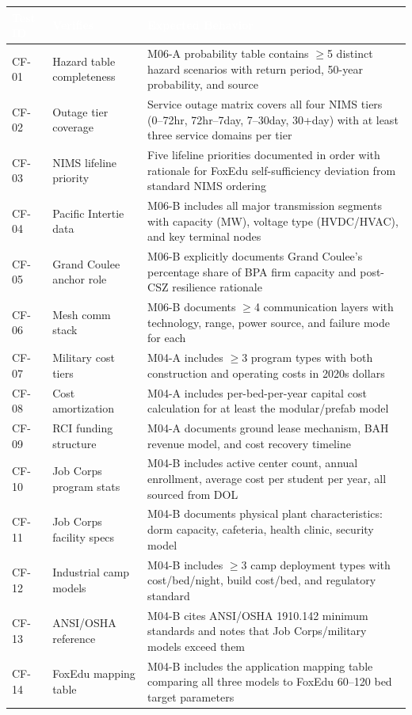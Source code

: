 \documentclass[11pt,letterpaper]{article}
\newcommand{\tableheader}[1]{\textbf{\sffamily\textcolor{white}{#1}}}
\begin{document}
\begin{center}
\begin{tabularx}{\textwidth}{C{1.5cm}L{3cm}X}
\toprule
{}
\tableheader{Test ID} & \tableheader{Verifies} & \tableheader{Expected Behavior} \\
\midrule
CF-01 & Hazard table completeness & M06-A probability table contains $\geq$5 distinct hazard scenarios with return period, 50-year probability, and source \\
CF-02 & Outage tier coverage & Service outage matrix covers all four NIMS tiers (0--72hr, 72hr--7day, 7--30day, 30+day) with at least three service domains per tier \\
CF-03 & NIMS lifeline priority & Five lifeline priorities documented in order with rationale for FoxEdu self-sufficiency deviation from standard NIMS ordering \\
CF-04 & Pacific Intertie data & M06-B includes all major transmission segments with capacity (MW), voltage type (HVDC/HVAC), and key terminal nodes \\
CF-05 & Grand Coulee anchor role & M06-B explicitly documents Grand Coulee's percentage share of BPA firm capacity and post-CSZ resilience rationale \\
CF-06 & Mesh comm stack & M06-B documents $\geq$4 communication layers with technology, range, power source, and failure mode for each \\
CF-07 & Military cost tiers & M04-A includes $\geq$3 program types with both construction and operating costs in 2020s dollars \\
CF-08 & Cost amortization & M04-A includes per-bed-per-year capital cost calculation for at least the modular/prefab model \\
CF-09 & RCI funding structure & M04-A documents ground lease mechanism, BAH revenue model, and cost recovery timeline \\
CF-10 & Job Corps program stats & M04-B includes active center count, annual enrollment, average cost per student per year, all sourced from DOL \\
CF-11 & Job Corps facility specs & M04-B documents physical plant characteristics: dorm capacity, cafeteria, health clinic, security model \\
CF-12 & Industrial camp models & M04-B includes $\geq$3 camp deployment types with cost/bed/night, build cost/bed, and regulatory standard \\
CF-13 & ANSI/OSHA reference & M04-B cites ANSI/OSHA 1910.142 minimum standards and notes that Job Corps/military models exceed them \\
CF-14 & FoxEdu mapping table & M04-B includes the application mapping table comparing all three models to FoxEdu 60--120 bed target parameters \\
\bottomrule
\end{tabularx}
\end{center}
\end{document}
